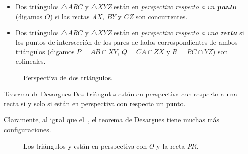 \begin{section-definition.tcb}{}{}
    \begin{itemize}
        \item Dos triángulos $\triangle ABC$ y $\triangle XYZ$ están en \textit{perspectiva respecto a un \textbf{punto}} (digamos $O$) si las rectas $AX$, $BY$ y $CZ$ son concurrentes.
        \item Dos triángulos $\triangle ABC$ y $\triangle XYZ$ están en \textit{perspectiva respecto a una \textbf{recta}} si los puntos de intersección de los pares de lados correspondientes de ambos triángulos (digamos $P = AB \cap XY$, $Q = CA \cap ZX$ y $R = BC \cap YZ$) son colineales.
    \end{itemize}
\end{section-definition.tcb}

\begin{figure}[H]
    \centering
    
    \caption{Perspectiva de dos triángulos.}
\end{figure}


\begin{section-theorem.tcb}{Teorema de Desargues}{}
    Dos triángulos están en perspectiva con respecto a una recta si y solo si están en perspectiva con respecto un punto.
\end{section-theorem.tcb}

Claramente, al igual que el~, el teorema de Desargues tiene muchas más configuraciones.

\begin{figure}[H]
    \centering
    
    \caption{Los triángulos  y  están en perspectiva con $O$ y la recta $PR$.}
\end{figure}

